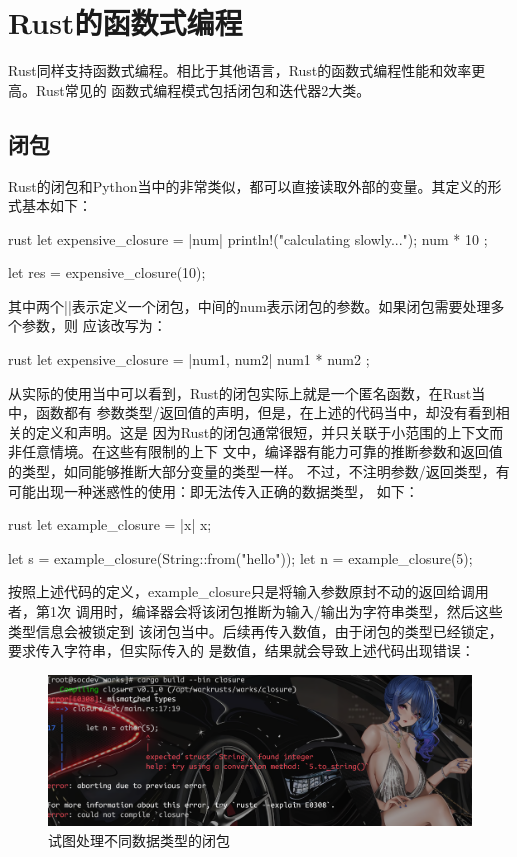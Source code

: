 \section{Rust的函数式编程}
Rust同样支持函数式编程。相比于其他语言，Rust的函数式编程性能和效率更高。Rust常见的
函数式编程模式包括闭包和迭代器2大类。

\subsection{闭包}
Rust的闭包和Python当中的非常类似，都可以直接读取外部的变量。其定义的形式基本如下：
\begin{code-block}{rust}
let expensive_closure = |num| {
    println!("calculating slowly...");
    num * 10
};

let res = expensive_closure(10);
\end{code-block}
其中两个||表示定义一个闭包，中间的num表示闭包的参数。如果闭包需要处理多个参数，则
应该改写为：
\begin{code-block}{rust}
let expensive_closure = |num1, num2| {
    num1 * num2
};
\end{code-block}

从实际的使用当中可以看到，Rust的闭包实际上就是一个匿名函数，在Rust当中，函数都有
参数类型/返回值的声明，但是，在上述的代码当中，却没有看到相关的定义和声明。这是
因为Rust的闭包通常很短，并只关联于小范围的上下文而非任意情境。在这些有限制的上下
文中，编译器有能力可靠的推断参数和返回值的类型，如同能够推断大部分变量的类型一样。
不过，不注明参数/返回类型，有可能出现一种迷惑性的使用：即无法传入正确的数据类型，
如下：
\begin{code-block}{rust}
let example_closure = |x| x;

let s = example_closure(String::from("hello"));
let n = example_closure(5);
\end{code-block}
按照上述代码的定义，example\_closure只是将输入参数原封不动的返回给调用者，第1次
调用时，编译器会将该闭包推断为输入/输出为字符串类型，然后这些类型信息会被锁定到
该闭包当中。后续再传入数值，由于闭包的类型已经锁定，要求传入字符串，但实际传入的
是数值，结果就会导致上述代码出现错误：
\begin{figure}[H]
  \centering
  \includegraphics[width=\linewidth]{rust_closure_diffrent_type.png}
  \caption{试图处理不同数据类型的闭包}
  \label{fig:rust_closure_diffrent}
\end{figure}

